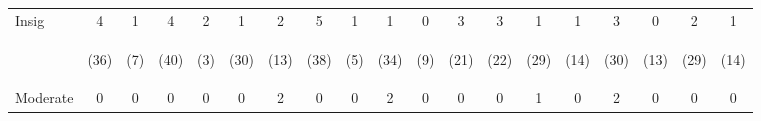\begin{tabular}{lcccccccccccccccccc}
\hline \noalign{\smallskip}Insig & 4 & 1 & 4 & 2 & 1 & 2 & 5 & 1 & 1 & 0 & 3 & 3 & 1 & 1 & 3 & 0 & 2 & 1\\
 & \begin{footnotesize}(36)\end{footnotesize} & \begin{footnotesize}(7)\end{footnotesize} & \begin{footnotesize}(40)\end{footnotesize} & \begin{footnotesize}(3)\end{footnotesize} & \begin{footnotesize}(30)\end{footnotesize} & \begin{footnotesize}(13)\end{footnotesize} & \begin{footnotesize}(38)\end{footnotesize} & \begin{footnotesize}(5)\end{footnotesize} & \begin{footnotesize}(34)\end{footnotesize} & \begin{footnotesize}(9)\end{footnotesize} & \begin{footnotesize}(21)\end{footnotesize} & \begin{footnotesize}(22)\end{footnotesize} & \begin{footnotesize}(29)\end{footnotesize} & \begin{footnotesize}(14)\end{footnotesize} & \begin{footnotesize}(30)\end{footnotesize} & \begin{footnotesize}(13)\end{footnotesize} & \begin{footnotesize}(29)\end{footnotesize} & \begin{footnotesize}(14)\end{footnotesize}\\
\noalign{\smallskip}Moderate & 0 & 0 & 0 & 0 & 0 & 2 & 0 & 0 & 2 & 0 & 0 & 0 & 1 & 0 & 2 & 0 & 0 & 0\\

\end{tabular}
